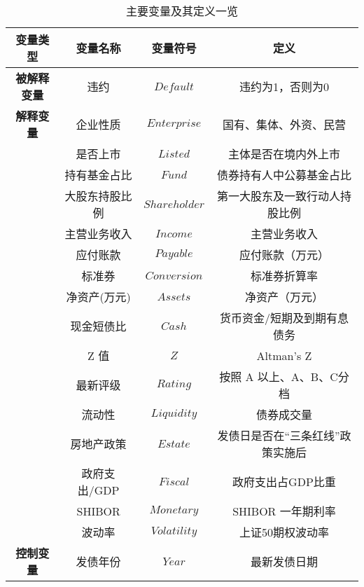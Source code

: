 \begin{table}[ht]
	\centering
	\caption{主要变量及其定义一览}
	\begin{tabular}{cccc}
		\hline
		\textbf{变量类型}  & \textbf{变量名称} & \textbf{变量符号}   & \textbf{定义}       \\ \hline
		\textbf{被解释变量} & 违约            & \(Default\)     & 违约为1，否则为0         \\\hline
		\textbf{解释变量}  & 企业性质          & \(Enterprise\)  & 国有、集体、外资、民营       \\
		               & 是否上市          & \(Listed\)      & 主体是否在境内外上市        \\
		               & 持有基金占比        & \(Fund\)        & 债券持有人中公募基金占比      \\
		               & 大股东持股比例       & \(Shareholder\) & 第一大股东及一致行动人持股比例   \\
		               & 主营业务收入        & \(Income\)      & 主营业务收入            \\
		               & 应付账款          & \(Payable\)     & 应付账款（万元）          \\
		               & 标准券           & \(Conversion\)  & 标准券折算率            \\
		               & 净资产(万元)       & \(Assets\)      & 净资产（万元）           \\
		               & 现金短债比         & \(Cash\)        & 货币资金/短期及到期有息债务    \\
		               & Z 值           & \(Z\)           & Altman's Z        \\
		               & 最新评级          & \(Rating\)      & 按照 A 以上、A、B、C分档   \\
		               & 流动性           & \(Liquidity\)   & 债券成交量             \\
		               & 房地产政策         & \(Estate\)      & 发债日是否在“三条红线”政策实施后 \\
		               & 政府支出/GDP      & \(Fiscal\)      & 政府支出占GDP比重        \\
		               & SHIBOR        & \(Monetary\)    & SHIBOR 一年期利率      \\
		               & 波动率           & \(Volatility\)  & 上证50期权波动率         \\\hline
		\textbf{控制变量}  & 发债年份          & \(Year\)        & 最新发债日期            \\
	\end{tabular}
	\label{tab:symbols}
\end{table}

